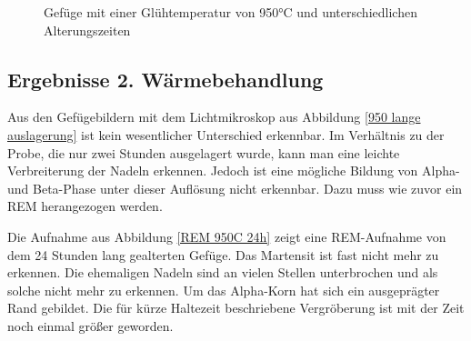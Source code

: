 \documentclass[a4paper, 11pt]{tubsreprt}
\begin{document}
\begin{figure} %
    \caption{Gefüge mit einer Glühtemperatur von 950°C und unterschiedlichen Alterungszeiten}
    \label{Glühung950+alterung}
\end{figure}
\subsection{Ergebnisse 2. Wärmebehandlung}
Aus den Gefügebildern mit dem Lichtmikroskop aus Abbildung \ref{950 lange auslagerung} ist kein wesentlicher Unterschied erkennbar. Im Verhältnis zu der Probe, die nur zwei Stunden ausgelagert wurde, kann man eine leichte Verbreiterung der Nadeln erkennen. Jedoch ist eine mögliche Bildung von Alpha- und Beta-Phase unter dieser Auflösung nicht erkennbar. Dazu muss wie zuvor ein REM herangezogen werden.

Die Aufnahme aus Abbildung \ref{REM 950C 24h} zeigt eine REM-Aufnahme von dem 24 Stunden lang gealterten Gefüge. Das Martensit ist fast nicht mehr zu erkennen. Die ehemaligen Nadeln sind an vielen Stellen unterbrochen und als solche nicht mehr zu erkennen. Um das Alpha-Korn hat sich ein ausgeprägter Rand gebildet. Die für kürze Haltezeit beschriebene Vergröberung ist mit der Zeit noch einmal größer geworden.
\end{document}
